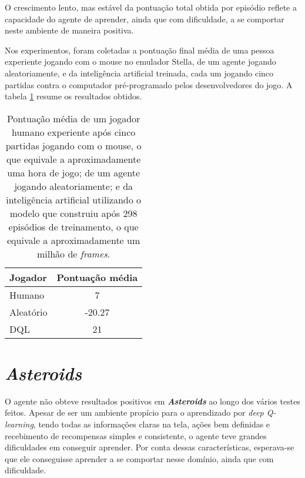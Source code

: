 
O crescimento lento, mas estável da pontuação total obtida por episódio reflete a capacidade do agente de aprender, ainda que com dificuldade, a se comportar neste ambiente de maneira positiva.

Nos experimentos, foram coletadas a pontuação final média de uma pessoa experiente jogando com o mouse no emulador Stella, de um agente jogando aleatoriamente, e da inteligência artificial treinada, cada um jogando cinco partidas contra o computador pré-programado pelos desenvolvedores do jogo.
A tabela \ref{table:pong_score} resume os resultados obtidos.

\begin{table}
\begin{center}
\begin{tabular}{l c}
\hline
Jogador & Pontuação média \\
\hline
Humano & 7 \\
Aleatório & -20.27 \\
DQL & 21 \\
\hline
\end{tabular}
\caption{Pontuação média de um jogador humano experiente após cinco partidas jogando com o mouse, o que equivale a aproximadamente uma hora de jogo; de um agente jogando aleatoriamente; e da inteligência artificial utilizando o modelo que construiu após 298 episódios de treinamento, o que equivale a aproximadamente um milhão de \textit{frames}.}
\label{table:pong_score}
\end{center}
\end{table}


\section{\textit{Asteroids}}
\label{sec:res_asteroids}
O agente não obteve resultados positivos em \textbf{\textit{Asteroids}} ao longo dos vários testes feitos.
Apesar de ser um ambiente propício para o aprendizado por \textit{deep Q-learning}, tendo todas as informações claras na tela, ações bem definidas e recebimento de recompensas simples e consistente, o agente teve grandes dificuldades em conseguir aprender.
Por conta dessas características, esperava-se que ele conseguisse aprender a se comportar nesse domínio, ainda que com dificuldade.

